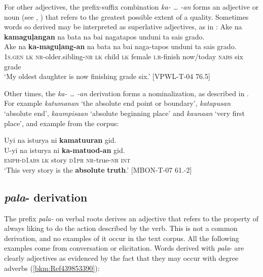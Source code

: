 For other adjectives, the prefix-suffix combination \textit{ka- … -an} forms an adjective or noun (see , ) that refers to the greatest possible extent of a quality. Sometimes words so derived may be interpreted as superlative adjectives, as in :
\ea
\label{bkm:Ref52463441}
Ake  na  \textbf{kamaguļangan}  na  bata  na  bai  nagatapos unduni ta  sais  grado. \\\smallskip
 \gll Ake  na  \textbf{ka-maguļang-an}  na  bata  na  bai  naga-tapos\footnotemark{} unduni ta  sais  grado. \\
1\textsc{s.gen}  \textsc{lk}  \textsc{nr}-older.sibling-\textsc{nr}  \textsc{lk}  child  \textsc{lk}  female  \textsc{i.r}-finish  now/today
\textsc{nabs}   six  grade \\
\glt `My oldest daughter is now finishing grade six.’ [VPWL-T-04 76.5]
\z

Other times, the \textit{ka- … -an} derivation forms a  nominalization, as described in  . For example \textit{katumanan} ‘the absolute end point or boundary’, \textit{katapusan} `absolute end', \textit{kaumpisaan} ‘absolute beginning place’ and \textit{kaunaan} ‘very first place’, and example  from the corpus:

\ea
\label{bkm:Ref113278812}
Uyi  na  isturya  ni  \textbf{kamatuuran}  gid. \\\smallskip
 \gll U-yi  na  isturya  ni  \textbf{ka-matuod-an}  gid. \\
\textsc{emph-d}1\textsc{abs}  \textsc{lk}  story  \textsc{d}1\textsc{pr}  \textsc{nr}-true-\textsc{nr}  \textsc{int} \\
\glt ‘This very story is the \textbf{absolute} \textbf{truth}.’ [MBON-T-07 61.-2]
\z

\subsection{\textit{pala}{}- derivation}
\label{sec:pala-derivation}

The prefix \textit{pala-} on verbal roots derives an adjective that refers to the property of always liking to do the action described by the verb. This is not a common derivation, and no examples of it occur in the text corpus. All the following examples come from conversation or elicitation. Words derived with \textit{pala}{}- are clearly adjectives as evidenced by the fact that they may occur with degree adverbs (\ref{bkm:Ref439853390}):

